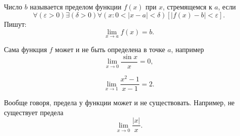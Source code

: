 \begin{opr}
	Число $b$ называется пределом функции $f(x)$ при $x$, стремящемся к $a$, если
	\begin{equation}
		\forall(\varepsilon > 0)\exists(\delta>0)\forall(x: 0<|x-a|<\delta)[|f(x)-b|<\varepsilon]
		.
	\end{equation}
	Пишут:
	\begin{equation}
		\lim_{x\to a} f(x) = b
		.
	\end{equation}
\end{opr}
Сама функция $f$ может и не быть определена в точке $a$, например
\begin{equation}
	\lim_{x\to 0} \frac{\sin x}{x} = 0
	,
\end{equation}

\begin{equation}
	\lim_{x\to 1} \frac{x^2-1}{x-1} = 2
	.
\end{equation}

Вообще говоря, предела у функции может и не существовать.
Например, не существует предела
\begin{equation}
	\lim_{x\to 0} \frac{|x|}{x}
	.
\end{equation}
